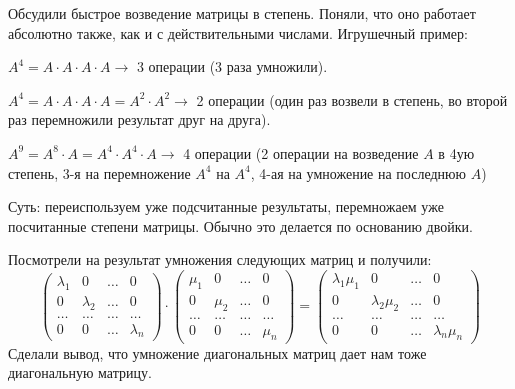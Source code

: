 \documentclass[10pt, a4paper]{extarticle}
\theoremstyle{definition}
\begin{document}
    Обсудили быстрое возведение матрицы в степень. Поняли, что оно работает абсолютно также, как и с действительными числами.
    Игрушечный пример:

    $A^4 = A \cdot A \cdot A \cdot A \to$  3 операции (3 раза умножили).

    $A^4 = A \cdot A \cdot A \cdot A = A^2 \cdot A^2 \to$ 2 операции (один раз возвели в степень, во второй раз перемножили результат друг на друга).

    $A^9 = A^8 \cdot A = A^4 \cdot A^4 \cdot A \to$ 4 операции
    (2 операции на возведение $A$ в 4ую степень, 3-я на перемножение $A^4$ на $A^4$, 4-ая на умножение на последнюю $A$)

    Суть: переиспользуем уже подсчитанные результаты, перемножаем уже посчитанные степени матрицы.
    Обычно это делается по основанию двойки.

    Посмотрели на результат умножения следующих матриц и получили:
    \[
    \begin{pmatrix}
        \lambda_1 & 0 & \dots & 0 \\
        0 & \lambda_2 & \dots & 0 \\
        \dots & \dots & \dots & \dots \\
        0 & 0 & \dots & \lambda_n
    \end{pmatrix}
    \cdot 
    \begin{pmatrix}
        \mu_1 & 0 & \dots & 0 \\
        0 & \mu_2 & \dots & 0 \\
        \dots & \dots & \dots & \dots \\
        0 & 0 & \dots & \mu_n
    \end{pmatrix}
    =
    \begin{pmatrix}
        \lambda_1 \mu_1 & 0 & \dots & 0 \\
        0 & \lambda_2 \mu_2 & \dots & 0 \\
        \dots & \dots & \dots & \dots \\
        0 & 0 & \dots & \lambda_n \mu_n
    \end{pmatrix}
    \]
    Сделали вывод, что умножение диагональных матриц дает нам тоже диагональную матрицу.
\end{document}

